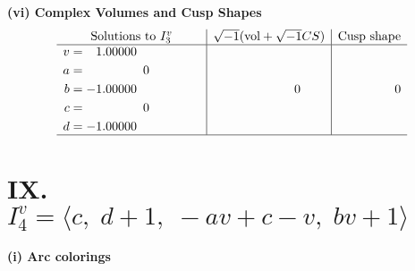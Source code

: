 \documentclass[1p]{elsarticle_modified}
\theoremstyle{definition}
\newcommand{\I}{\sqrt{-1}}
\begin{document}
\newpage\flushleft \textbf{(vi) Complex Volumes and Cusp Shapes}
$$\begin{array}{c|c|c}  
\text{Solutions to }I^v_{3}& \I (\text{vol} + \sqrt{-1}CS) & \text{Cusp shape}\\
 \hline 
\begin{aligned}
v &= \phantom{-}1.00000\phantom{ +0.000000I} \\
a &= \phantom{-0.000000 } 0 \\
b &= -1.00000\phantom{ +0.000000I} \\
c &= \phantom{-0.000000 } 0 \\
d &= -1.00000\phantom{ +0.000000I}\end{aligned}
 & \phantom{-0.000000 } 0 & \phantom{-0.000000 } 0\\
 \hline 
 \end{array}$$\newpage\newpage\renewcommand{\arraystretch}{1}
\centering \section*{IX. $I^v_{4}= \langle c,\;d+1,\;- a v+c- v,\;b v+1 \rangle$}
\flushleft \textbf{(i) Arc colorings}\\
\end{document}
